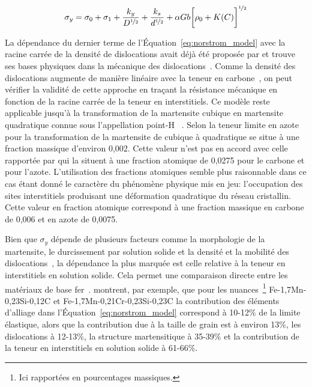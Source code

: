 \begin{equation}
  \sigma_{y}=\sigma_{0}+\sigma_{1}+\frac{k_{y}}{D^{\nicefrac{1}{2}}}
    +\frac{k_{s}}{d^{\nicefrac{1}{2}}}+
    \alpha{Gb}\biggr[\rho_{0}+K(C)\biggr]^{\nicefrac{1}{2}}
  \label{eq:norstrom_model}
\end{equation}

La dépendance du dernier terme de l'Équation~\ref{eq:norstrom_model} avec la racine carrée de la densité de dislocations avait déjà été proposée par \citet{Cohen1968} et trouve ses bases physiques dans la mécanique des dislocations~\cite{Haasen19962009,Hutchinson20115845}. Comme la densité des dislocations augmente de manière linéaire avec la teneur en carbone~\cite{Krauss1999,Morito20031475}, on peut vérifier la validité de cette approche en traçant la résistance mécanique en fonction de la racine carrée de la teneur en interstitiels. Ce modèle reste applicable jusqu'à la transformation de la martensite cubique en martensite quadratique connue sous l'appellation \og{} point-H \fg{}~\cite{Sherby2008}. 
Selon \citet{vanGent1985} la teneur limite en azote pour la transformation de la martensite de cubique à quadratique se situe à une fraction massique d'environ 0,002. Cette valeur n'est pas en accord avec celle rapportée par \citet{Sherby2008} qui la situent à une fraction atomique de 0,0275 pour le carbone et pour l'azote. L'utilisation des fractions atomiques semble plus raisonnable dans ce cas étant donné le caractère du phénomène physique mis en jeu: l'occupation des sites interstitiels produisant une déformation quadratique du réseau cristallin. Cette valeur en fraction atomique correspond à une fraction massique en carbone de 0,006 et en azote de 0,0075.

Bien que $\sigma_{y}$ dépende de plusieurs facteurs comme la morphologie de la martensite, le durcissement par solution solide et la densité et la mobilité des dislocations~\cite{Krauss1999}, la dépendance la plus marquée est celle relative à la teneur en interstitiels en solution solide. Cela permet une comparaison directe entre les matériaux de base fer~\cite{Grange1977,Hutchinson20115845}. \citet{Hutchinson20115845} montrent, par exemple, que pour les nuances~\footnote{Ici rapportées en pourcentages massiques.} Fe-1,7Mn-0,23Si-0,12C et Fe-1,7Mn-0,21Cr-0,23Si-0,23C la contribution des éléments d'alliage dans l'Équation~\ref{eq:norstrom_model} correspond à 10-12\% de la limite élastique, alors que la contribution due à la taille de grain est à environ 13\%, les dislocations à 12-13\%, la structure martensitique à 35-39\% et la contribution de la teneur en interstitiels en solution solide à 61-66\%.

